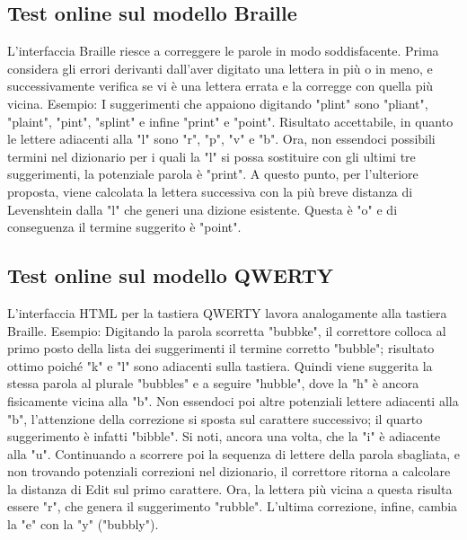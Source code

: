 \documentclass[a4paper,11pt]{article}
\begin{document}
	\subsection{Test online sul modello Braille}
    	L'interfaccia Braille riesce a correggere  le parole in modo soddisfacente.
        Prima considera gli errori derivanti dall'aver digitato una lettera in più o in meno, e successivamente verifica se vi è una lettera errata
        e la corregge con quella più vicina.
        Esempio:
        I suggerimenti che appaiono digitando "plint" sono "pliant", "plaint", "pint", "splint" e infine "print" e "point".
        Risultato accettabile, in quanto le lettere adiacenti alla "l" sono "r", "p", "v" e "b".
        Ora, non essendoci possibili termini nel dizionario per i quali la "l" si possa sostituire con gli ultimi tre suggerimenti, la potenziale 
        parola è "print".
        A questo punto, per l'ulteriore proposta, viene calcolata la lettera successiva con la più breve distanza di Levenshtein dalla "l" che generi una 
        dizione esistente. Questa è "o" e di conseguenza il termine suggerito è "point".
        
	\subsection{Test online sul modello QWERTY}
     	L'interfaccia HTML per la tastiera QWERTY lavora analogamente alla tastiera Braille.
        Esempio:
        Digitando la parola scorretta "bubbke", il correttore colloca al primo posto della lista dei suggerimenti il termine corretto "bubble";
        risultato ottimo poiché "k" e "l" sono adiacenti sulla tastiera.
        Quindi viene suggerita la stessa parola al plurale "bubbles" e a seguire "hubble", dove la "h" è ancora fisicamente vicina alla "b".
        Non essendoci poi altre potenziali lettere adiacenti alla "b", l'attenzione della correzione si sposta sul carattere successivo; il quarto 
        suggerimento è infatti "bibble". Si noti, ancora una volta, che la "i" è adiacente alla "u".
        Continuando a scorrere poi la sequenza di lettere della parola sbagliata, e non trovando potenziali correzioni nel dizionario, il correttore 
        ritorna a calcolare la distanza di Edit sul primo carattere. Ora, la lettera più vicina a questa risulta essere "r", che genera il suggerimento "rubble".
        L'ultima correzione, infine, cambia la "e" con la "y" ("bubbly").
\newpage
\end{document}

